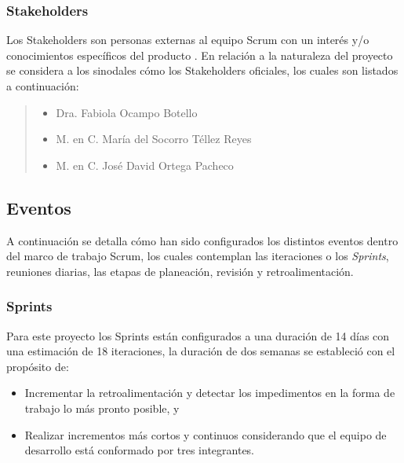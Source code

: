 \subsubsection{Stakeholders}

 Los Stakeholders son personas externas al equipo Scrum con un interés y/o conocimientos
 específicos del producto \cite{ScrumGlosary}. En relación a la naturaleza del proyecto se
 considera a los sinodales cómo los Stakeholders oficiales, los cuales son listados a
 continuación:

    \begin{quote}
    \begin{itemize}
        \item Dra. Fabiola Ocampo Botello
        \item M. en C. María del Socorro Téllez Reyes
        \item M. en C. José David Ortega Pacheco
    \end{itemize}
    \end{quote}

\subsection{Eventos}

 A continuación se detalla cómo han sido configurados los distintos eventos dentro del marco de trabajo
 Scrum, los cuales contemplan las iteraciones o los {\it Sprints}, reuniones diarias, las etapas de
 planeación, revisión y retroalimentación.

\subsubsection{Sprints}

 \noindent Para este proyecto los Sprints están configurados a una duración de 14 días con una
 estimación de 18 iteraciones, la duración de dos semanas se estableció con el propósito de:

    \begin{itemize}
    \item Incrementar la retroalimentación y detectar los impedimentos
          en la forma de trabajo lo más pronto posible, y

    \item Realizar incrementos más cortos y continuos considerando que el
          equipo de desarrollo está conformado por tres integrantes.
    \end{itemize}

